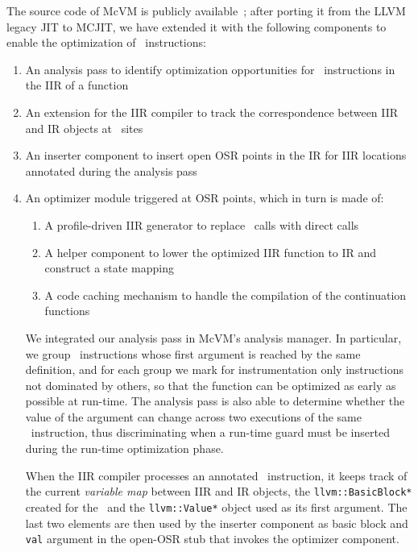 The source code of McVM is publicly available~\cite{mcvm}; after porting it from the LLVM legacy JIT to MCJIT, we have extended it with the following components to enable the optimization of \feval\ instructions:
\begin{enumerate}
\item An analysis pass to identify optimization opportunities for \feval\ instructions in the IIR of a function
\item An extension for the IIR compiler to track the correspondence between IIR and IR objects at \feval\ sites
\item An inserter component to insert open OSR points in the IR for IIR locations annotated during the analysis pass
\item An optimizer module triggered at OSR points, which in turn is made of:
\ifdefined \noauthorea
\begin{enumerate}[noitemsep]
\else
\begin{enumerate}
\fi
\item A profile-driven IIR generator to replace \feval\ calls with direct calls
\item A helper component to lower the optimized IIR function to IR and construct a state mapping 
\item A code caching mechanism to handle the compilation of the continuation functions
\end{enumerate}
\end{enumerate}

We integrated our analysis pass in McVM's analysis manager. In particular, we group \feval\ instructions whose first argument is reached by the same definition, and for each group we mark for instrumentation only instructions not dominated by others, so that the function can be optimized as early as possible at run-time. The analysis pass is also able to determine whether the value of the argument can change across two executions of the same \feval\ instruction, thus discriminating when a run-time guard must be inserted during the run-time optimization phase.

When the IIR compiler processes an annotated \feval\ instruction, it keeps track of the current {\em variable map} between IIR and IR objects, the {\tt llvm::BasicBlock*} created for the \feval\ and the {\tt llvm::Value*} object used as its first argument. The last two elements are then used by the inserter component as basic block and {\tt val} argument in the open-OSR stub that invokes the optimizer component.


\end{enumerate}
